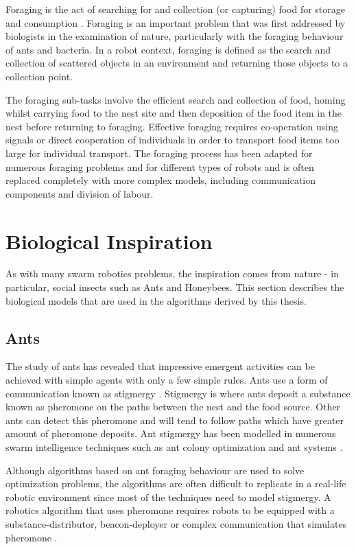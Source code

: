 Foraging is the act of searching for and collection (or capturing) food for storage and consumption \cite{winfield2009foraging}. Foraging is an important problem that was first addressed by biologists in the examination of nature, particularly with the foraging behaviour of ants and bacteria. In a robot context, foraging is defined as the search and collection of scattered objects in an environment and returning those objects to a collection point.

The foraging sub-tasks involve the efficient search and collection of food, homing whilst carrying food to the nest site and then deposition of the food item in the nest before returning to foraging. Effective foraging requires co-operation using signals or direct cooperation of individuals in order to transport food items too large for individual transport. The foraging process has been adapted for numerous foraging problems and for different types of robots and is often replaced completely with more complex models, including communication components and division of labour. 

\section{Biological Inspiration}
\label{foraging:biologicalinspiration}
As with many swarm robotics problems, the inspiration comes from nature - in particular, social insects such as Ants and Honeybees. This section describes the biological models that are used in the algorithms derived by this thesis. 

\label{sec:second:biological}

\subsection{Ants}
\label{biological:ants}
The study of ants has revealed that impressive emergent activities can be achieved with  simple agents with only a few simple rules. Ants use a form of communication known as stigmergy \cite{dorigo2000ant}. Stigmergy is where ants deposit a substance known as pheromone on the paths between the nest and the food source. Other ants can detect this pheromone and will tend to follow paths which have greater amount of pheromone deposits. Ant stigmergy has been modelled in numerous swarm intelligence techniques such as ant colony optimization and ant systems \cite{dorigo2006ant, dorigo2010ant}. 
 
Although algorithms based on ant foraging behaviour are used to solve optimization problems, the algorithms are often difficult to replicate in a real-life robotic environment since most of the techniques need to model stigmergy. A robotics algorithm that uses pheromone requires robots to be equipped with a substance-distributor, beacon-deployer or complex communication that simulates pheromone \cite{hoff2010two}.

